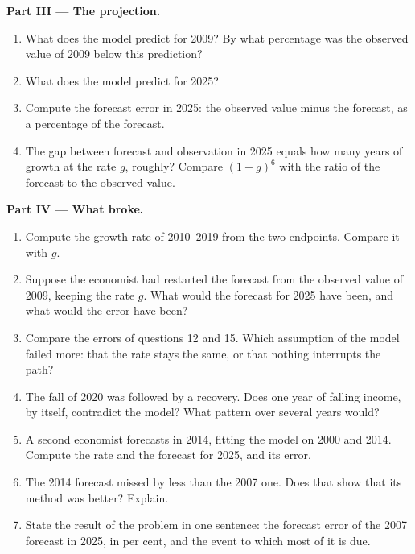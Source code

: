 \begin{problem}
\medskip
\noindent\textbf{Part III --- The projection.}
\begin{enumerate}[resume]
\item What does the model predict for 2009? By what percentage was the observed value of 2009 below
  this prediction?
\item What does the model predict for 2025?
\item Compute the forecast error in 2025: the observed value minus the forecast, as a percentage of
  the forecast.
\item The gap between forecast and observation in 2025 equals how many years of growth at the rate
  $g$, roughly? Compare $(1+g)^6$ with the ratio of the forecast to the observed value.
\end{enumerate}

\medskip
\noindent\textbf{Part IV --- What broke.}
\begin{enumerate}[resume]
\item Compute the growth rate of 2010--2019 from the two endpoints. Compare it with $g$.
\item Suppose the economist had restarted the forecast from the observed value of 2009, keeping the
  rate $g$. What would the forecast for 2025 have been, and what would the error have been?
\item Compare the errors of questions 12 and 15. Which assumption of the model failed more: that the
  rate stays the same, or that nothing interrupts the path?
\item The fall of 2020 was followed by a recovery. Does one year of falling income, by itself,
  contradict the model? What pattern over several years would?
\item A second economist forecasts in 2014, fitting the model on 2000 and 2014. Compute the rate and
  the forecast for 2025, and its error.
\item The 2014 forecast missed by less than the 2007 one. Does that show that its method was better?
  Explain.
\item State the result of the problem in one sentence: the forecast error of the 2007 forecast in
  2025, in per cent, and the event to which most of it is due.
\end{enumerate}
\end{problem}
